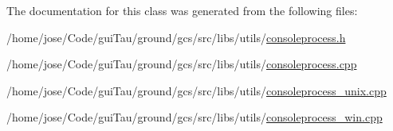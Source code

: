 The documentation for this class was generated from the following files\-:\begin{DoxyCompactItemize}
\item 
/home/jose/\-Code/gui\-Tau/ground/gcs/src/libs/utils/\hyperlink{consoleprocess_8h}{consoleprocess.\-h}\item 
/home/jose/\-Code/gui\-Tau/ground/gcs/src/libs/utils/\hyperlink{consoleprocess_8cpp}{consoleprocess.\-cpp}\item 
/home/jose/\-Code/gui\-Tau/ground/gcs/src/libs/utils/\hyperlink{consoleprocess__unix_8cpp}{consoleprocess\-\_\-unix.\-cpp}\item 
/home/jose/\-Code/gui\-Tau/ground/gcs/src/libs/utils/\hyperlink{consoleprocess__win_8cpp}{consoleprocess\-\_\-win.\-cpp}\end{DoxyCompactItemize}
